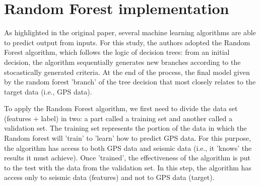 \documentclass{article}
\begin{document}

\vspace*{0.5cm}
\section{Random Forest implementation}

As highlighted in the original paper, several machine learning algorithms are able to predict output from inputs. For this study, the authors adopted the Random Forest algorithm, which follows the logic of decision trees: from an initial decision, the algorithm sequentially generates new branches according to the stocastically generated criteria. At the end of the process, the final model given by the random forest 'branch' of the tree decision that most closely relates to the target data (i.e., GPS data).

To apply the Random Forest algorithm, we first need to divide the data set (features + label) in two: a part called a training set and another called a validation set. The training set represents the portion of the data in which the Random forest will 'train' to 'learn' how to predict GPS data. For this purpose, the algorithm has access to both GPS data and seismic data (i.e., it 'knows' the results it must achieve). Once 'trained', the effectiveness of the algorithm is put to the test with the data from the validation set. In this step, the algorithm has access only to seismic data (features) and not to GPS data (target). 


\end{document}
